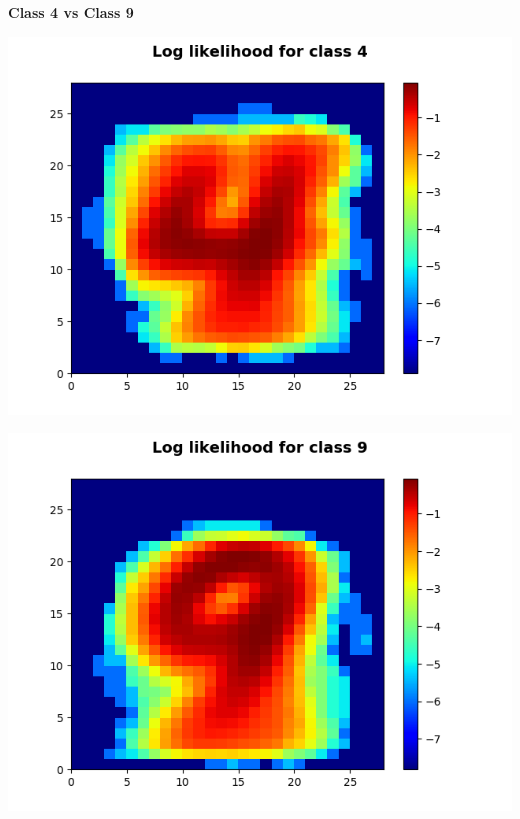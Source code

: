\documentclass[11pt]{article}
\begin{document}
\textbf{Class 4 vs Class 9}\\
\begin{center}
\includegraphics[scale=0.7]{part1/1/log_likelihood_4.png}
\end{center}

\begin{center}
\includegraphics[scale=0.7]{part1/1/log_likelihood_9.png}
\end{center}
\end{document}
